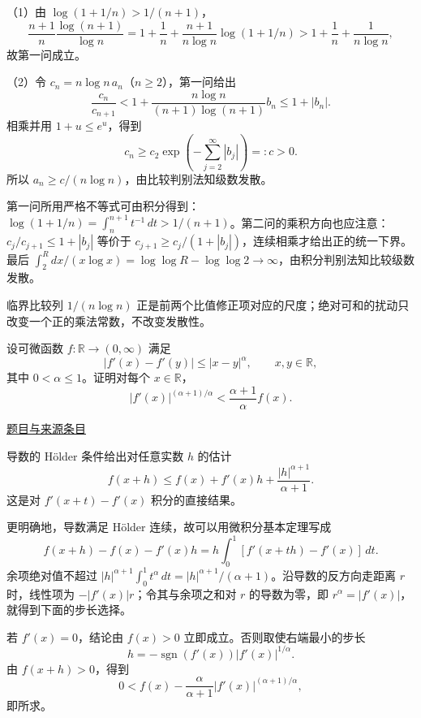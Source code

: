 \documentclass[UTF8,12pt,a4paper,fontset=fandol]{ctexart}
\begin{document}
\begin{solve}\label{ans:pre10-math:5}

（1）由 $\log(1+1/n)>1/(n+1)$，
\[
\frac{n+1}{n}\frac{\log(n+1)}{\log n}
=1+\frac1n+\frac{n+1}{n\log n}\log(1+1/n)
>1+\frac1n+\frac1{n\log n},
\]
故第一问成立。

（2）令 $c_n=n\log n\,a_n$（$n\ge2$），第一问给出
\[
\frac{c_n}{c_{n+1}}
<1+\frac{n\log n}{(n+1)\log(n+1)}b_n
\le1+|b_n|.
\]
相乘并用 $1+u\le e^u$，得到
\[
c_n\ge c_2\exp\!\left(-\sum_{j=2}^\infty|b_j|\right)=:c>0.
\]
所以 $a_n\ge c/(n\log n)$，由比较判别法知级数发散。

第一问所用严格不等式可由积分得到：$\log(1+1/n)=\int_n^{n+1}t^{-1}\,dt>1/(n+1)$。第二问的乘积方向也应注意：$c_j/c_{j+1}\le1+|b_j|$ 等价于 $c_{j+1}\ge c_j/(1+|b_j|)$，连续相乘才给出正的统一下界。最后 $\int_2^R dx/(x\log x)=\log\log R-\log\log2\to\infty$，由积分判别法知比较级数发散。

\end{solve}

\begin{remark}[方法与条件]临界比较列 $1/(n\log n)$ 正是前两个比值修正项对应的尺度；绝对可和的扰动只改变一个正的乘法常数，不改变发散性。\end{remark}

\begin{example}[来源序号6]\label{ex:pre10-math:6}\label{pr:pre10-math:6}

设可微函数 $f:\mathbb R\to(0,\infty)$ 满足
\[
|f'(x)-f'(y)|\le|x-y|^\alpha,\qquad x,y\in\mathbb R,
\]
其中 $0<\alpha\le1$。证明对每个 $x\in\mathbb R$，
\[
|f'(x)|^{(\alpha+1)/\alpha}<\frac{\alpha+1}{\alpha}f(x).
\]

\par\href{https://github.com/lzxcr/cmc-mathematics/blob/64916fa1fdbc3e444a652eca204d5669058ee321/src/problems/preliminary/10/06.md}{题目与来源条目}

\end{example}

\begin{solve}\label{ans:pre10-math:6}

导数的 Hölder 条件给出对任意实数 $h$ 的估计
\[
f(x+h)\le f(x)+f'(x)h+\frac{|h|^{\alpha+1}}{\alpha+1}.
\]
这是对 $f'(x+t)-f'(x)$ 积分的直接结果。

更明确地，导数满足 Hölder 连续，故可以用微积分基本定理写成
\[
f(x+h)-f(x)-f'(x)h
=h\int_0^1[f'(x+th)-f'(x)]\,dt.
\]
余项绝对值不超过 $|h|^{\alpha+1}\int_0^1t^\alpha\,dt=|h|^{\alpha+1}/(\alpha+1)$。沿导数的反方向走距离 $r$ 时，线性项为 $-|f'(x)|r$；令其与余项之和对 $r$ 的导数为零，即 $r^\alpha=|f'(x)|$，就得到下面的步长选择。

若 $f'(x)=0$，结论由 $f(x)>0$ 立即成立。否则取使右端最小的步长
\[
h=-\operatorname{sgn}(f'(x))|f'(x)|^{1/\alpha}.
\]
由 $f(x+h)>0$，得到
\[
0<f(x)-\frac\alpha{\alpha+1}|f'(x)|^{(\alpha+1)/\alpha},
\]
即所求。

\end{solve}
\end{document}
